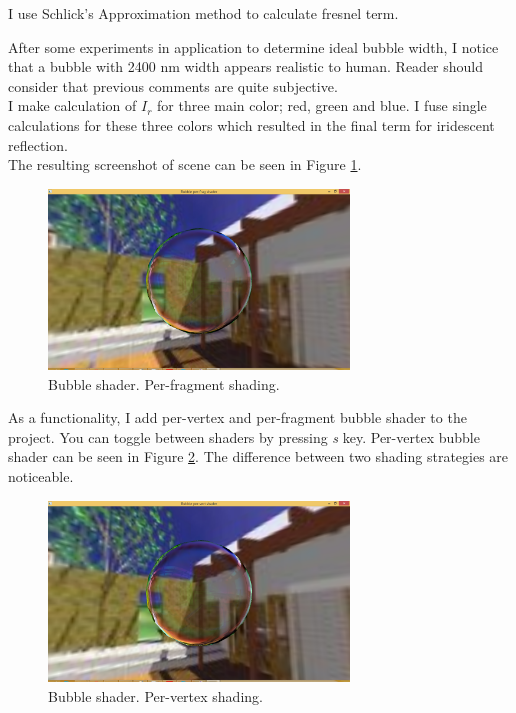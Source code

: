 I use Schlick's Approximation method \cite{Schlick94aninexpensive} to calculate fresnel term.

After some experiments in application to determine ideal bubble width, I notice that a bubble with 2400 nm width appears realistic to human. Reader should consider that previous comments are quite subjective.\\


I make calculation of \emph{$I_{r}$} for three main color; red, green and blue. I fuse single calculations for these three colors which resulted in the final term for iridescent reflection.\\

The resulting screenshot of scene can be seen in Figure \ref{fig:report-2}.

\begin{figure}[hp]
\centering
\includegraphics[width=8cm]{../Screenshots/report/2.png}
\caption{Bubble shader. Per-fragment shading.}
\label{fig:report-2}
\end{figure}

As a functionality, I add per-vertex and per-fragment bubble shader to the project. You can toggle between shaders by pressing \emph{s} key. Per-vertex bubble shader can be seen in Figure \ref{fig:report-3}. The difference between two shading strategies are noticeable. \\


\begin{figure}[hp]
\centering
\includegraphics[width=8cm]{../Screenshots/report/3.png}
\caption{Bubble shader. Per-vertex shading.}
\label{fig:report-3}
\end{figure}


